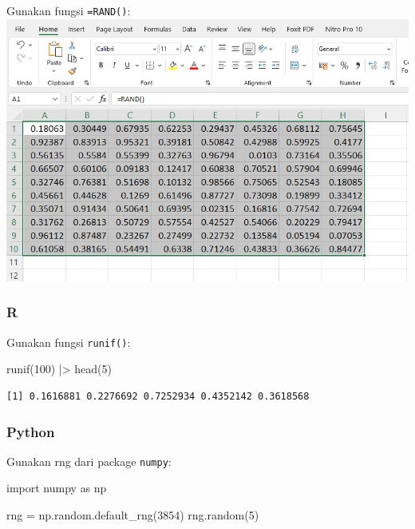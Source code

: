 \documentclass[
  letterpaper,
  DIV=11,
  numbers=noendperiod]{scrreprt}
\newenvironment{Shaded}{\begin{snugshade}}{\end{snugshade}}
\newcommand{\DecValTok}[1]{\textcolor[rgb]{0.68,0.00,0.00}{#1}}
\newcommand{\FunctionTok}[1]{\textcolor[rgb]{0.28,0.35,0.67}{#1}}
\newcommand{\ImportTok}[1]{\textcolor[rgb]{0.00,0.46,0.62}{#1}}
\newcommand{\NormalTok}[1]{\textcolor[rgb]{0.00,0.23,0.31}{#1}}
\newcommand{\OperatorTok}[1]{\textcolor[rgb]{0.37,0.37,0.37}{#1}}
\newcommand{\SpecialCharTok}[1]{\textcolor[rgb]{0.37,0.37,0.37}{#1}}
\begin{document}
Gunakan fungsi \texttt{=RAND()}: \includegraphics{./excel-rand.png}

\hypertarget{r}{%
\subsubsection{R}\label{r}}

Gunakan fungsi \texttt{runif()}:

\begin{Shaded}
\begin{Highlighting}[]
\FunctionTok{runif}\NormalTok{(}\DecValTok{100}\NormalTok{) }\SpecialCharTok{|\textgreater{}} \FunctionTok{head}\NormalTok{(}\DecValTok{5}\NormalTok{)}
\end{Highlighting}
\end{Shaded}

\begin{verbatim}
[1] 0.1616881 0.2276692 0.7252934 0.4352142 0.3618568
\end{verbatim}

\hypertarget{python}{%
\subsubsection{Python}\label{python}}

Gunakan rng dari package \texttt{numpy}:

\begin{Shaded}
\begin{Highlighting}[]
\ImportTok{import}\NormalTok{ numpy }\ImportTok{as}\NormalTok{ np}

\NormalTok{rng }\OperatorTok{=}\NormalTok{ np.random.default\_rng(}\DecValTok{3854}\NormalTok{)}
\NormalTok{rng.random(}\DecValTok{5}\NormalTok{)}
\end{Highlighting}
\end{Shaded}
\end{document}

